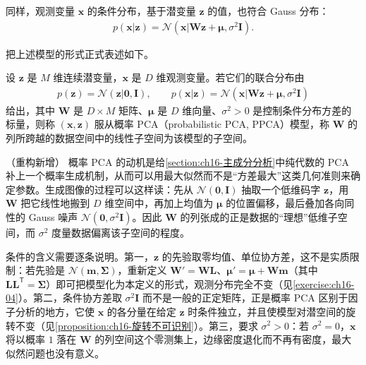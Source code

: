 \documentclass[../../main.tex]{subfiles}
\begin{document}
同样，观测变量 $\bm{x}$ 的条件分布，基于潜变量 $\bm{z}$ 的值，也符合 Gauss 分布：
\begin{align}
  p(\bm{x}|\bm{z})=\mathcal{N}(\bm{x}|\bm{W}\bm{z}+\bm{\mu},\sigma^2\bm{I}).
  \label{align:ch16-条件分布}
\end{align}

把上述模型的形式正式表述如下。

\begin{definition}[概率 PCA]\label{definition:ch16-概率PCA}
设 $\bm{z}$ 是 $M$ 维连续潜变量，$\bm{x}$ 是 $D$ 维观测变量。若它们的联合分布由
\begin{align*}
  p(\bm{z})=\mathcal{N}(\bm{z}|\bm{0},\bm{I}),\qquad
  p(\bm{x}|\bm{z})=\mathcal{N}(\bm{x}|\bm{W}\bm{z}+\bm{\mu},\sigma^2\bm{I})
\end{align*}
给出，其中 $\bm{W}$ 是 $D\times M$ 矩阵、$\bm{\mu}$ 是 $D$ 维向量、$\sigma^2>0$ 是控制条件分布方差的标量，则称 $(\bm{x},\bm{z})$ 服从概率 PCA（probabilistic PCA, PPCA）模型，称 $\bm{W}$ 的列所跨越的数据空间中的线性子空间为该模型的子空间。
\end{definition}

\begin{remark}（重构新增）
概率 PCA 的动机是给\cref{section:ch16-主成分分析}中纯代数的 PCA 补上一个概率生成机制，从而可以用最大似然而不是“方差最大”这类几何准则来确定参数。生成图像的过程可以这样读：先从 $\mathcal{N}(\bm{0},\bm{I})$ 抽取一个低维码字 $\bm{z}$，用 $\bm{W}$ 把它线性地搬到 $D$ 维空间中，再加上均值为 $\bm{\mu}$ 的位置偏移，最后叠加各向同性的 Gauss 噪声 $\mathcal{N}(\bm{0},\sigma^2\bm{I})$。因此 $\bm{W}$ 的列张成的正是数据的“理想”低维子空间，而 $\sigma^2$ 度量数据偏离该子空间的程度。

条件的含义需要逐条说明。第一，$\bm{z}$ 的先验取零均值、单位协方差，这不是实质限制：若先验是 $\mathcal{N}(\bm{m},\bm{\Sigma})$，重新定义 $\bm{W}'=\bm{W}\bm{L}$、$\bm{\mu}'=\bm{\mu}+\bm{W}\bm{m}$（其中 $\bm{L}\bm{L}^{\mathsf T}=\bm{\Sigma}$）即可把模型化为本定义的形式，观测分布完全不变（见\cref{exercise:ch16-04}）。第二，条件协方差取 $\sigma^2\bm{I}$ 而不是一般的正定矩阵，正是概率 PCA 区别于因子分析的地方，它使 $\bm{x}$ 的各分量在给定 $\bm{z}$ 时条件独立，并且使模型对潜空间的旋转不变（见\cref{proposition:ch16-旋转不可识别}）。第三，要求 $\sigma^2>0$：若 $\sigma^2=0$，$\bm{x}$ 将以概率 $1$ 落在 $\bm{W}$ 的列空间这个零测集上，边缘密度退化而不再有密度，最大似然问题也没有意义。
\end{remark}
\end{document}
